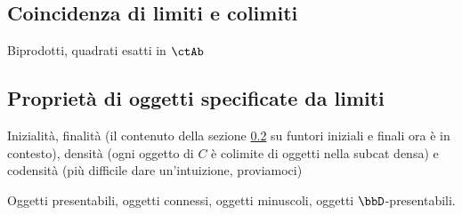 \subsection{Coincidenza di limiti e colimiti}
Biprodotti, quadrati esatti in \(\ctAb\)
\subsection{Proprietà di oggetti specificate da limiti}
Inizialità, finalità (il contenuto della sezione \ref{} su funtori iniziali e finali ora è in contesto), densità (ogni oggetto di \(C\) è colimite di oggetti nella subcat densa) e codensità (più difficile dare un'intuizione, proviamoci)

Oggetti presentabili, oggetti connessi, oggetti minuscoli, oggetti \(\bbD\)-presentabili.





